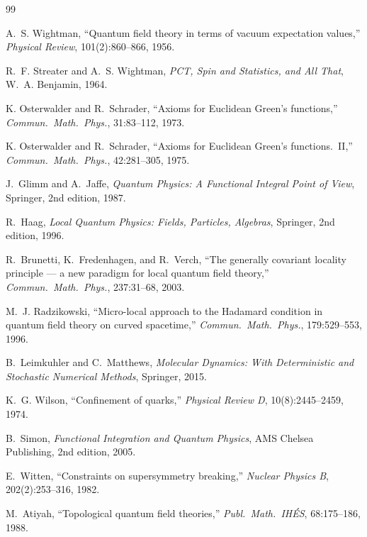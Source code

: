 \documentclass[12pt,a4paper]{article}
\theoremstyle{plain}
\theoremstyle{definition}
\theoremstyle{remark}
\begin{document}
\begin{thebibliography}{99}

A.~S. Wightman,
``Quantum field theory in terms of vacuum expectation values,''
\emph{Physical Review}, 101(2):860--866, 1956.

R.~F. Streater and A.~S. Wightman,
\emph{PCT, Spin and Statistics, and All That},
W.~A. Benjamin, 1964.

K. Osterwalder and R.~Schrader,
``Axioms for Euclidean Green's functions,''
\emph{Commun.\ Math.\ Phys.}, 31:83--112, 1973.

K. Osterwalder and R.~Schrader,
``Axioms for Euclidean Green's functions.\ II,''
\emph{Commun.\ Math.\ Phys.}, 42:281--305, 1975.

J.~Glimm and A.~Jaffe,
\emph{Quantum Physics: A Functional Integral Point of View},
Springer, 2nd edition, 1987.

R.~Haag,
\emph{Local Quantum Physics: Fields, Particles, Algebras},
Springer, 2nd edition, 1996.

R.~Brunetti, K.~Fredenhagen, and R.~Verch,
``The generally covariant locality principle ---
a new paradigm for local quantum field theory,''
\emph{Commun.\ Math.\ Phys.}, 237:31--68, 2003.

M.~J. Radzikowski,
``Micro-local approach to the Hadamard condition in quantum field
theory on curved spacetime,''
\emph{Commun.\ Math.\ Phys.}, 179:529--553, 1996.

B.~Leimkuhler and C.~Matthews,
\emph{Molecular Dynamics: With Deterministic and Stochastic Numerical
  Methods}, Springer, 2015.

K.~G. Wilson,
``Confinement of quarks,''
\emph{Physical Review D}, 10(8):2445--2459, 1974.

B.~Simon,
\emph{Functional Integration and Quantum Physics},
AMS Chelsea Publishing, 2nd edition, 2005.

E.~Witten,
``Constraints on supersymmetry breaking,''
\emph{Nuclear Physics B}, 202(2):253--316, 1982.

M.~Atiyah,
``Topological quantum field theories,''
\emph{Publ.\ Math.\ IH\'ES}, 68:175--186, 1988.


\end{thebibliography}
\end{document}
